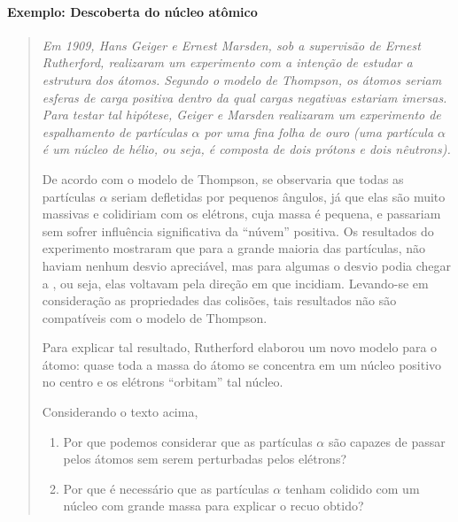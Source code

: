 \paragraph{Exemplo: Descoberta do núcleo atômico}

\begin{quote}
{\it Em 1909, Hans Geiger e Ernest Marsden, sob a supervisão de Ernest Rutherford, realizaram um experimento com a intenção de estudar a estrutura dos átomos. Segundo o modelo de Thompson, os átomos seriam esferas de carga positiva dentro da qual cargas negativas estariam imersas. Para testar tal hipótese, Geiger e Marsden realizaram um experimento de espalhamento de partículas $\alpha$ por uma fina folha de ouro (uma partícula $\alpha$ é um núcleo de hélio, ou seja, é composta de dois prótons e dois nêutrons). 

De acordo com o modelo de Thompson, se observaria que todas as partículas $\alpha$ seriam defletidas por pequenos ângulos, já que elas são muito massivas e colidiriam com os elétrons, cuja massa é pequena, e passariam sem sofrer influência significativa da ``núvem'' positiva. Os resultados do experimento mostraram que para a grande maioria das partículas, não haviam nenhum desvio apreciável, mas para algumas o desvio podia chegar a , ou seja, elas voltavam pela direção em que incidiam. Levando-se em consideração as propriedades das colisões, tais resultados não são compatíveis com o modelo de Thompson.

Para explicar tal resultado, Rutherford elaborou um novo modelo para o átomo: quase toda a massa do átomo se concentra em um núcleo positivo no centro e os elétrons ``orbitam'' tal núcleo.}

Considerando o texto acima,
\begin{enumerate}[label=(\alph*)]
    \item Por que podemos considerar que as partículas $\alpha$ são capazes de passar pelos átomos sem serem perturbadas pelos elétrons?
    \item Por que é necessário que as partículas $\alpha$ tenham colidido com um núcleo com grande massa para explicar o recuo obtido?
\end{enumerate}
\end{quote}

